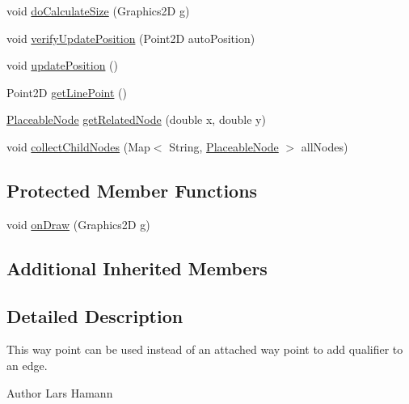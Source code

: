 \begin{DoxyCompactItemize}
\item 
void \hyperlink{classorg_1_1tzi_1_1use_1_1gui_1_1views_1_1diagrams_1_1waypoints_1_1_qualifier_way_point_a06d11cf9f134a9e0bd648e398f1c5a3b}{do\-Calculate\-Size} (Graphics2\-D g)
\item 
void \hyperlink{classorg_1_1tzi_1_1use_1_1gui_1_1views_1_1diagrams_1_1waypoints_1_1_qualifier_way_point_a9d16f2857bd31a1bfe4e9d3bce2ac3b2}{verify\-Update\-Position} (Point2\-D auto\-Position)
\item 
void \hyperlink{classorg_1_1tzi_1_1use_1_1gui_1_1views_1_1diagrams_1_1waypoints_1_1_qualifier_way_point_aacd4ebbb2a878fa7d0d861832c0bc23f}{update\-Position} ()
\item 
Point2\-D \hyperlink{classorg_1_1tzi_1_1use_1_1gui_1_1views_1_1diagrams_1_1waypoints_1_1_qualifier_way_point_a093a6a0472951118949628f100a68dcb}{get\-Line\-Point} ()
\item 
\hyperlink{classorg_1_1tzi_1_1use_1_1gui_1_1views_1_1diagrams_1_1elements_1_1_placeable_node}{Placeable\-Node} \hyperlink{classorg_1_1tzi_1_1use_1_1gui_1_1views_1_1diagrams_1_1waypoints_1_1_qualifier_way_point_ad09aab41349e97c5c89903b9e4c7e407}{get\-Related\-Node} (double x, double y)
\item 
void \hyperlink{classorg_1_1tzi_1_1use_1_1gui_1_1views_1_1diagrams_1_1waypoints_1_1_qualifier_way_point_abffa9a12b00ccc0c9deb95a5d68dd736}{collect\-Child\-Nodes} (Map$<$ String, \hyperlink{classorg_1_1tzi_1_1use_1_1gui_1_1views_1_1diagrams_1_1elements_1_1_placeable_node}{Placeable\-Node} $>$ all\-Nodes)
\end{DoxyCompactItemize}
\subsection*{Protected Member Functions}
\begin{DoxyCompactItemize}
\item 
void \hyperlink{classorg_1_1tzi_1_1use_1_1gui_1_1views_1_1diagrams_1_1waypoints_1_1_qualifier_way_point_a194437c01928094c65369fef88d0cecc}{on\-Draw} (Graphics2\-D g)
\end{DoxyCompactItemize}
\subsection*{Additional Inherited Members}


\subsection{Detailed Description}
This way point can be used instead of an attached way point to add qualifier to an edge. \begin{DoxyAuthor}{Author}
Lars Hamann 
\end{DoxyAuthor}


